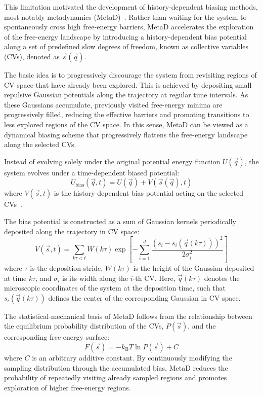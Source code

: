 This limitation motivated the development of history-dependent biasing methods, most notably metadynamics (MetaD)~\cite{termo_metad_presion}. Rather than waiting for the system to spontaneously cross high free-energy barriers, MetaD accelerates the exploration of the free-energy landscape by introducing a history-dependent bias potential along a set of predefined slow degrees of freedom, known as collective variables (CVs), denoted as $\vec{s}(\vec{q})$.

The basic idea is to progressively discourage the system from revisiting regions of CV space that have already been explored. This is achieved by depositing small repulsive Gaussian potentials along the trajectory at regular time intervals. As these Gaussians accumulate, previously visited free-energy minima are progressively filled, reducing the effective barriers and promoting transitions to less explored regions of the CV space. In this sense, MetaD can be viewed as a dynamical biasing scheme that progressively flattens the free-energy landscape along the selected CVs.

Instead of evolving solely under the original potential energy function $U(\vec{q})$, the system evolves under a time-dependent biased potential:
\begin{equation}
U_{\mathrm{bias}}(\vec{q},t)
=
U(\vec{q}) + V(\vec{s}(\vec{q}),t)
\end{equation}
where $V(\vec{s},t)$ is the history-dependent bias potential acting on the selected CVs~\cite{termo_metad_presion}.

The bias potential is constructed as a sum of Gaussian kernels periodically deposited along the trajectory in CV space:
\begin{equation}\label{eq:metad_bias}
V(\vec{s},t)
=
\sum_{k\tau < t}
W(k\tau)
\exp\left[
-\sum_{i=1}^{d}
\frac{
\left(s_i-s_i(\vec{q}(k\tau))\right)^2
}{2\sigma_i^2}
\right]
\end{equation}
where $\tau$ is the deposition stride, $W(k\tau)$ is the height of the Gaussian deposited at time $k\tau$, and $\sigma_i$ is its width along the $i$-th CV. Here, $\vec{q}(k\tau)$ denotes the microscopic coordinates of the system at the deposition time, such that $s_i(\vec{q}(k\tau))$ defines the center of the corresponding Gaussian in CV space.

The statistical-mechanical basis of MetaD follows from the relationship between the equilibrium probability distribution of the CVs, $P(\vec{s})$, and the corresponding free-energy surface:
\begin{equation}
F(\vec{s}) = -k_{\mathrm{B}}T\ln P(\vec{s}) + C
\end{equation}
where $C$ is an arbitrary additive constant. By continuously modifying the sampling distribution through the accumulated bias, MetaD reduces the probability of repeatedly visiting already sampled regions and promotes exploration of higher free-energy regions.

